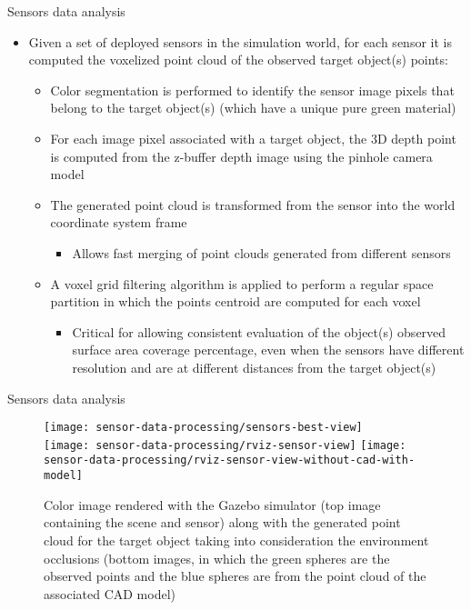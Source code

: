 \begin{frame}{Sensors data analysis}
	\begin{itemize}
		\item Given a set of deployed sensors in the simulation world, for each sensor it is computed the voxelized point cloud of the observed target object(s) points:
		\begin{itemize}
			\item Color segmentation is performed to identify the sensor image pixels that belong to the target object(s) (which have a unique pure green material)
			\item For each image pixel associated with a target object, the 3D depth point is computed from the z-buffer depth image using the pinhole camera model
			\item The generated point cloud is transformed from the sensor into the world coordinate system frame
			\begin{itemize}
				\item Allows fast merging of point clouds generated from different sensors
			\end{itemize}
			\item A voxel grid filtering algorithm is applied to perform a regular space partition in which the points centroid are computed for each voxel
			\begin{itemize}
				\item Critical for allowing consistent evaluation of the object(s) observed surface area coverage percentage, even when the sensors have different resolution and are at different distances from the target object(s)
			\end{itemize}
		\end{itemize}
	\end{itemize}
\end{frame}


\begin{frame}{Sensors data analysis}
	\begin{figure}
		\centering
		\texttt{[image: sensor-data-processing/sensors-best-view]}\\
		\vspace{0.5em}
		\texttt{[image: sensor-data-processing/rviz-sensor-view]}\hspace{2em}
		\texttt{[image: sensor-data-processing/rviz-sensor-view-without-cad-with-model]}
		\caption{Color image rendered with the Gazebo simulator (top image containing the scene and sensor) along with the generated point cloud for the target object taking into consideration the environment occlusions (bottom images, in which the green spheres are the observed points and the blue spheres are from the point cloud of the associated CAD model)}
	\end{figure}
\end{frame}



